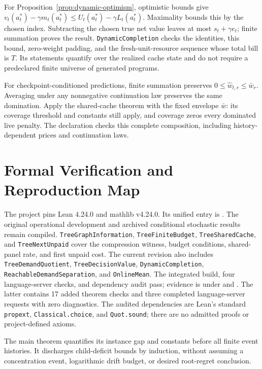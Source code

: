 For Proposition~\ref{prop:dynamic-optimism}, optimistic bounds give
$v_t(a_t^*)-\gamma m_t(a_t^*)\le U_t(a_t^*)-\gamma L_t(a_t^*)$.
Maximality bounds this by the chosen index. Subtracting the chosen true net
value leaves at most $s_t+\gamma e_t$; finite summation proves the result.
\texttt{DynamicCompletion} checks the identities, this bound, zero-weight
padding, and the fresh-unit-resource sequence whose total bill is $T$.
Its statements quantify over the realized cache state and do not require a
predeclared finite universe of generated programs.

For checkpoint-conditioned predictions, finite summation preserves
$0\le\widehat w_{t,r}\le\bar w_r$. Averaging under any nonnegative continuation
law preserves the same domination. Apply the shared-cache theorem with the
fixed envelope $\bar w$: its coverage threshold and constants still apply,
and coverage zeros every dominated live penalty. The declaration
 checks this complete
composition, including history-dependent prices and continuation laws.

\section{Formal Verification and Reproduction Map}
\label{app:lean}
The project pins Lean 4.24.0 and mathlib v4.24.0. Its unified entry is . The original operational development and archived conditional stochastic results remain compiled. \texttt{TreeGraphInformation}, \texttt{TreeFiniteBudget}, \texttt{TreeSharedCache}, and \texttt{TreeNextUnpaid} cover the compression witness, budget conditions, shared-panel rate, and first unpaid cost. The current revision also includes \texttt{TreeDemandQuotient}, \texttt{TreeDecisionValue}, \texttt{DynamicCompletion}, \texttt{ReachableDemandSeparation}, and \texttt{OnlineMean}. The integrated build, four language-server checks, and dependency audit pass; evidence is under  and . The latter contains 17 added theorem checks and three completed language-server requests with zero diagnostics. The audited dependencies are Lean's standard \texttt{propext}, \texttt{Classical.choice}, and \texttt{Quot.sound}; there are no admitted proofs or project-defined axioms.



The main theorem quantifies its instance gap and constants before all finite event histories. It discharges child-deficit bounds by induction, without assuming a concentration event, logarithmic drift budget, or desired root-regret conclusion.

